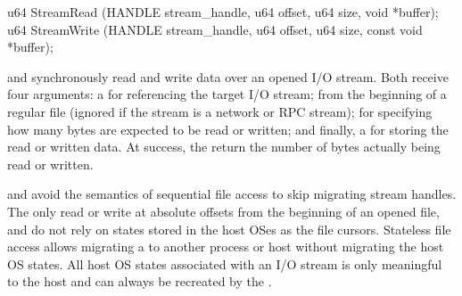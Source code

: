 


\begin{paldef}
u64 StreamRead  (HANDLE stream_handle, u64 offset, u64 size,
                 void *buffer);
u64 StreamWrite (HANDLE stream_handle, u64 offset, u64 size,
                 const void *buffer);
\end{paldef}                   
              
 and  synchronously
read and write data over an opened I/O stream.
Both \hostapis{} receive four arguments: a  for referencing the target I/O stream;
 from the beginning of a regular file
(ignored if the stream is a network or RPC stream);
 for specifying how many bytes are expected to be read or written;
and finally, a  for storing the read or written data.
At success, the \hostapis{} return the number of bytes
actually being read or written.


     







 and  avoid the semantics of sequential file access
to skip migrating stream handles.
The \hostapis{} only read or write at absolute offsets
from the beginning of an opened file,
and do not rely on states stored in the host OSes as the file cursors.
Stateless file access 
allows migrating a \libos{} to another process or host 
without migrating the host OS states.
All host OS states associated with an I/O stream is only meaningful to the host
and can always be recreated by the \libos{}.






